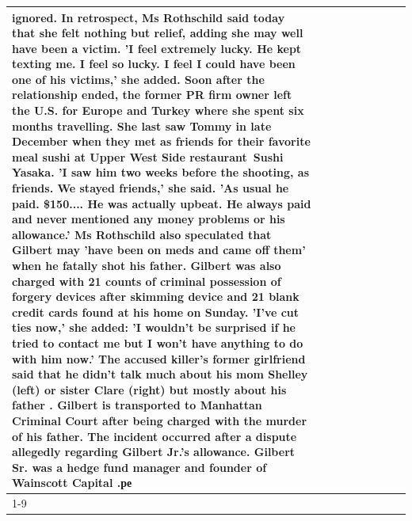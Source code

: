 \begin{table}[H]
\begin{tabular}{lllrlllll}
ignored. In retrospect, Ms Rothschild said today that she felt nothing but relief, adding she may well have been a victim. 'I feel extremely lucky. He kept texting me. I feel so lucky. I feel I could have been one of his victims,' she added. Soon after the relationship ended, the former PR firm owner left the U.S. for Europe and Turkey where she spent six months  travelling. She last saw Tommy in late December when they met as friends for their favorite meal sushi at Upper West Side restaurant Sushi Yasaka. 'I saw him two weeks before the shooting, as friends. We stayed friends,' she said. 'As usual he paid. \$150.... He was actually upbeat. He always paid and never mentioned any money problems or his allowance.' Ms Rothschild also speculated that Gilbert may 'have been on meds and came off them' when he fatally shot his father. Gilbert was also charged with 21 counts of criminal possession of forgery devices after skimming device and 21 blank credit cards found at his home on Sunday. 'I've cut ties now,' she added: 'I wouldn’t be surprised if he tried to contact me but I won’t have anything to do with him now.' The accused killer's former girlfriend said that he didn't talk much about his mom Shelley (left) or sister Clare (right) but mostly about his father . Gilbert is transported to Manhattan Criminal Court  after being charged with the murder of his father. The incident occurred after a dispute allegedly regarding Gilbert Jr.'s allowance. Gilbert Sr. was a hedge fund manager and founder of Wainscott Capital .ре \\
\cline{1-9}

\end{tabular}
\end{table}
